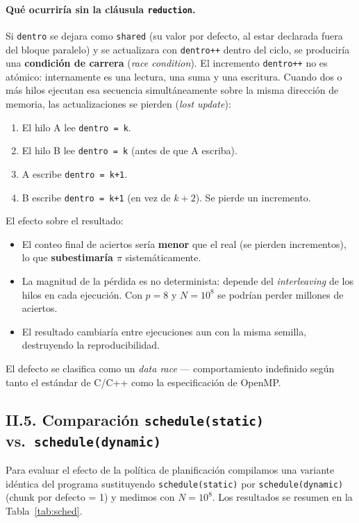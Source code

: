 \documentclass[12pt,a4paper]{article}
\begin{document}
\paragraph{Qu\'e ocurrir\'ia sin la cl\'ausula \texttt{reduction}.}
Si \texttt{dentro} se dejara como \texttt{shared} (su valor por defecto, al estar declarada fuera del bloque paralelo) y se actualizara con \texttt{dentro++} dentro del ciclo, se producir\'ia una \textbf{condici\'on de carrera} (\emph{race condition}). El incremento \texttt{dentro++} no es at\'omico: internamente es una lectura, una suma y una escritura. Cuando dos o m\'as hilos ejecutan esa secuencia simult\'aneamente sobre la misma direcci\'on de memoria, las actualizaciones se pierden (\emph{lost update}):

\begin{enumerate}
  \item El hilo A lee \texttt{dentro = k}.
  \item El hilo B lee \texttt{dentro = k} (antes de que A escriba).
  \item A escribe \texttt{dentro = k+1}.
  \item B escribe \texttt{dentro = k+1} (en vez de $k+2$). Se pierde un incremento.
\end{enumerate}

El efecto sobre el resultado:
\begin{itemize}
  \item El conteo final de aciertos ser\'ia \textbf{menor} que el real (se pierden incrementos), lo que \textbf{subestimar\'ia $\pi$} sistem\'aticamente.
  \item La magnitud de la p\'erdida es no determinista: depende del \emph{interleaving} de los hilos en cada ejecuci\'on. Con $p=8$ y $N=10^8$ se podr\'ian perder millones de aciertos.
  \item El resultado cambiar\'ia entre ejecuciones aun con la misma semilla, destruyendo la reproducibilidad.
\end{itemize}

El defecto se clasifica como un \emph{data race} --- comportamiento indefinido seg\'un tanto el est\'andar de C/C++ como la especificaci\'on de OpenMP.

\subsection*{II.5. Comparaci\'on \texttt{schedule(static)} vs.\ \texttt{schedule(dynamic)}}

Para evaluar el efecto de la pol\'itica de planificaci\'on compilamos una variante id\'entica del programa sustituyendo \texttt{schedule(static)} por \texttt{schedule(dynamic)} (chunk por defecto = 1) y medimos con $N=10^8$. Los resultados se resumen en la Tabla~\ref{tab:sched}.
\end{document}
